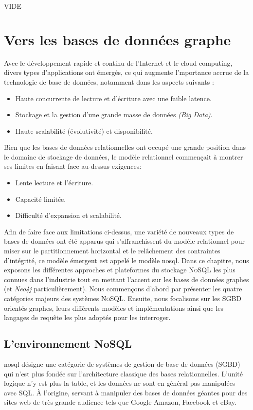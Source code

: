 \newpage

{\color{red}
  VIDE
}
\newpage
\chapter{Vers les bases de données graphe}
\label{ch:graph-db}
Avec le développement rapide et continu de l'Internet et le cloud
computing, divers types d'applications ont émergés, ce qui augmente
l'mportance accrue de la technologie de base de données, notamment
dans les aspects suivants \cite{han2011survey}:

\begin{itemize}
\item Haute concurrente de lecture et d'écriture avec une faible
  latence.
\item Stockage et la gestion d'une grande masse de données \emph{(Big
    Data)}.
\item Haute scalabilité (évolutivité) et disponibilité.
\end{itemize}

Bien que les bases de données relationnelles ont occupé une grande
position dans le domaine de stockage de données, le modèle relationnel
commençait à montrer ses limites en faisant face au-dessus exigences:

\begin{itemize}
\item Lente lecture et l'écriture.
\item Capacité limitée.
\item Difficulté d'expansion et scalabilité.
\end{itemize}

Afin de faire face aux limitations ci-dessus, une variété de nouveaux
types de bases de données ont été apparus qui s'affranchissent du
modèle relationnel pour miser sur le partitionnement horizontal et le
relâchement des contraintes d'intégrité, ce modèle émergent est appelé
le modèle \acrshort{nosql}. Dans ce chapitre, nous exposons les
différentes approches et plateformes du stockage \textsc{NoSQL} les
plus connues dans l'industrie tout en mettant l'accent sur les bases
de données graphes (et \emph{Neo4j} particulièrement). Nous commençons
d'abord par présenter les quatre catégories majeurs des systèmes
\textsc{NoSQL}. Ensuite, nous focalisons sur les \acrshort{SGBD}
orientés graphes, leurs différents modèles et implémentations ainsi que
les langages de requête les plus adoptés pour les interroger.


\section{L'environnement NoSQL}
\label{sec:nosql}
\acrshort{nosql} désigne une catégorie de systèmes de gestion de base
de données (\acrshort{SGBD}) qui n'est plus fondée sur l'architecture
classique des bases relationnelles. L'unité logique n'y est plus la
table, et les données ne sont en général pas manipulées avec
\textsc{SQL}. À l'origine, servant à manipuler des bases de données
géantes pour des sites web de très grande audience tels que Google
Amazon, Facebook et eBay.

